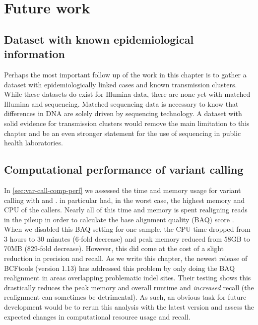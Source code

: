 \section{Future work}

\subsection{Dataset with known epidemiological information}
Perhaps the most important follow up of the work in this chapter is to gather a dataset with epidemiologically linked cases and known transmission clusters. While these datasets do exist for Illumina data, there are none yet with matched Illumina and \ont{} sequencing. Matched sequencing data is necessary to know that differences in DNA are solely driven by sequencing technology. A dataset with solid evidence for transmission clusters would remove the main limitation to this chapter and be an even stronger statement for the use of \ont{} sequencing in public health laboratories.

\subsection{Computational performance of variant calling}
\label{sec:fw-comp-perf}
In \autoref{sec:var-call-comp-perf} we assessed the time and memory usage for variant calling with \bcftools{} and \pandora{}. \bcftools{} in particular had, in the worst case, the highest memory and CPU of the callers. Nearly all of this time and memory is spent realigning reads in the pileup in order to calculate the base alignment quality (BAQ) score \cite{li2011}. When we disabled this BAQ setting for one sample, the CPU time dropped from 3 hours to 30 minutes (6-fold decrease) and peak memory reduced from 58GB to 70MB (829-fold decrease). However, this did come at the cost of a slight reduction in precision and recall. As we write this chapter, the newest release of BCFtools (version 1.13) has addressed this problem by only doing the BAQ realignment in areas overlapping problematic indel sites. Their testing shows this drastically reduces the peak memory and overall runtime and \emph{increased} recall (the realignment can sometimes be detrimental). As such, an obvious task for future development would be to rerun this analysis with the latest \bcftools{} version and assess the expected changes in computational resource usage and recall.

